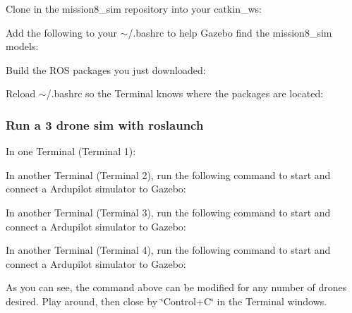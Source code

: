 Clone in the mission8\+\_\+sim repository into your catkin\+\_\+ws\+: 
\begin{DoxyCode}{0}
\end{DoxyCode}


Add the following to your {\ttfamily $\sim$/.bashrc} to help Gazebo find the mission8\+\_\+sim models\+: 
\begin{DoxyCode}{0}
\end{DoxyCode}


Build the R\+OS packages you just downloaded\+: 
\begin{DoxyCode}{0}
\end{DoxyCode}


Reload {\ttfamily $\sim$/.bashrc} so the Terminal knows where the packages are located\+: 
\begin{DoxyCode}{0}
\end{DoxyCode}


\subsubsection*{Run a 3 drone sim with roslaunch}

In one Terminal (Terminal 1)\+: 
\begin{DoxyCode}{0}
\end{DoxyCode}
 In another Terminal (Terminal 2), run the following command to start and connect a Ardupilot simulator to Gazebo\+: 
\begin{DoxyCode}{0}
\end{DoxyCode}
 In another Terminal (Terminal 3), run the following command to start and connect a Ardupilot simulator to Gazebo\+: 
\begin{DoxyCode}{0}
\end{DoxyCode}
 In another Terminal (Terminal 4), run the following command to start and connect a Ardupilot simulator to Gazebo\+: 
\begin{DoxyCode}{0}
\end{DoxyCode}
 As you can see, the command above can be modified for any number of drones desired. Play around, then close by \char`\"{}\+Control+\+C\char`\"{} in the Terminal windows.

